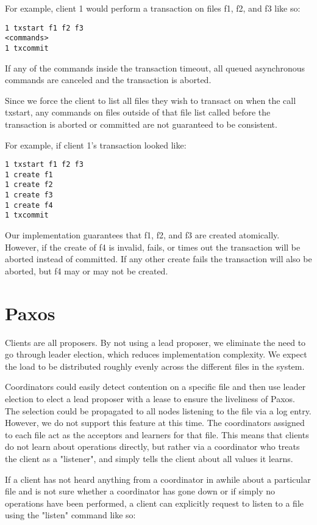 \documentclass[11pt]{article}
\begin{document}
For example, client 1 would perform a transaction on files f1, f2, and f3 like so:

\begin{verbatim}
1 txstart f1 f2 f3
<commands>
1 txcommit
\end{verbatim}

If any of the commands inside the transaction timeout, all queued asynchronous commands are canceled and the transaction is aborted.

Since we force the client to list all files they wish to transact on when the call txstart, any commands on files outside of that file list called before the transaction is aborted or committed are not guaranteed to be consistent.

For example, if client 1's transaction looked like:

\begin{verbatim}
1 txstart f1 f2 f3
1 create f1
1 create f2
1 create f3
1 create f4
1 txcommit
\end{verbatim}

Our implementation guarantees that f1, f2, and f3 are created atomically.
However, if the create of f4 is invalid, fails, or times out the transaction will be aborted instead of committed.
If any other create fails the transaction will also be aborted, but f4 may or may not be created.

\section{Paxos}

Clients are all proposers. By not using a lead proposer, we eliminate the need to go through leader election, which reduces implementation complexity. We expect the load to be distributed roughly evenly across the different files in the system.

Coordinators could easily detect contention on a specific file and then use leader election to elect a lead proposer with a lease to ensure the liveliness of Paxos.
The selection could be propagated to all nodes listening to the file via a log entry.
However, we do not support this feature at this time.
The coordinators assigned to each file act as the acceptors and learners for that file. This means that clients do not learn about operations directly, but rather via a coordinator who treats the client as a "listener", and simply tells the client about all values it learns.

If a client has not heard anything from a coordinator in awhile about a particular file and is not sure whether a coordinator has gone down or if simply no operations have been performed, a client can explicitly request to listen to a file using the "listen" command like so:
\end{document}
